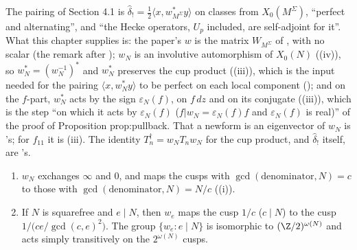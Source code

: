 \begin{paperlink}\label{pl:modforms:wN}
The pairing of Section 4.1 is $\hat\delta_!=\frac12\langle x,w_{M^\Sigma}^*y\rangle$ on classes from $X_0(M^\Sigma)$, ``perfect and alternating'', and ``the Hecke operators, $U_p$ included, are
self-adjoint for it''. What this chapter supplies is: the paper's $w$ is the matrix $W_{M^\Sigma}$ of , with no scalar (the remark after
); $w_N$ is an involutive automorphism of $X_0(N)$ ((iv)), so $w_N^*=(w_N^{-1})^*$ and $w_N^*$ preserves the cup product
((iii)), which is the input needed for the pairing $\langle x,w_N^*y\rangle$ to be perfect on each local component (); and on the
$f$-part, $w_N^*$ acts by the sign $\varepsilon_N(f)$, on $f\,dz$ and on its conjugate ((iii)), which is the step ``on which it acts by $\varepsilon_N(f)$
($f|w_N=\varepsilon_N(f)f$ and $\varepsilon_N(f)$ is real)'' of the proof of Proposition prop:pullback. That a newform is an eigenvector of $w_N$ is 's; for $f_{11}$ it is
(iii). The identity $T_n^\dagger=w_NT_nw_N$ for the cup product, and $\hat\delta_!$ itself, are 's.
\end{paperlink}

\begin{proposition}\label{prop:modforms:atkin-lehner-cusps}
\begin{enumerate}[label=(\roman*)]
\item $w_N$ exchanges $\infty$ and $0$, and maps the cusps with $\gcd(\text{denominator},N)=c$ to those with $\gcd(\text{denominator},N)=N/c$ ((i)).
\item If $N$ is squarefree and $e\mid N$, then $w_e$ maps the cusp $1/c$ ($c\mid N$) to the cusp $1/\bigl(ce/\gcd(c,e)^2\bigr)$. The group $\{w_e:e\mid N\}$ is isomorphic to $(\Z/2)^{\omega(N)}$ and
acts simply transitively on the $2^{\omega(N)}$ cusps.
\end{enumerate}
\end{proposition}

